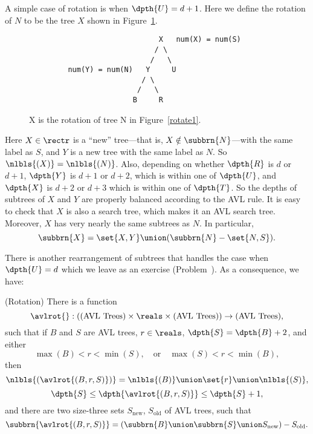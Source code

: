 \begin{definition}
\begin{figure}
\end{figure}

A simple case of rotation is when $\dpth{U} = d+1$.  Here we define
the rotation of $N$ to be the tree $X$ shown in Figure~\ref{rotate2}.

\begin{figure}

\begin{verbatim}
                              X   num(X) = num(S)
                             / \
                            /   \
         num(Y) = num(N)   Y     U
                          / \  
                         /   \
                        B     R   
\end{verbatim}

\caption{X is the rotation of tree N in Figure~\ref{rotate1}.}

\label{rotate2}
                                                                   
\end{figure}                                                       

Here $X \in \rectr$ is a ``new'' tree---that is, $X \notin
\subbrn{N}$---with the same label as $S$, and $Y$ is a new tree with
the same label as $N$.  So $\nlbls{(X)} = \nlbls{(N)}$.  Also,
depending on whether $\dpth{R}$ is $d$ or $d+1$, $\dpth{Y}$ is $d+1$
or $d+2$, which is within one of $\dpth{U}$, and $\dpth{X}$ is $d+2$
or $d+3$ which is within one of $\dpth{T}$.  So the depths of subtrees
of $X$ and $Y$ are properly balanced according to the AVL rule.  It is
easy to check that $X$ is also a search tree, which makes it an AVL
search tree.  Moreover, $X$ has very nearly the same subtrees as $N$.
In particular,
\[
\subbrn{X} = \set{X,Y} \union (\subbrn{N} - \set{N,S}).
\]

There is another rearrangement of subtrees that handles the case when
$\dpth{U} = d$ which we leave as an exercise
(Problem~).  As a consequence, we have:

\begin{lemma}(Rotation)\label{lem:rot}
There is a function
\[
\avlrot{}: (\text{(AVL Trees)} \times \reals\times \text{(AVL Trees)}) \to \text{(AVL Trees)},
\]
such that if $B$ and $S$ are AVL trees, $r \in \reals$, $\dpth{S}=\dpth{B}+2$, and either
\[
\max(B) < r < \min(S),\quad \text{or}\quad  \max(S) < r < \min(B),
\]
then
\[
    \nlbls{(\avlrot{(B,r,S)})} = \nlbls{(B)} \union \set{r} \union \nlbls{(S)},
\]
\[
\dpth{S} \leq \dpth{\avlrot{(B,r,S)}} \leq  \dpth{S}+1,
\]
and there are two size-three sets $S_{\text{new}}$, $S_{\text{old}}$
of AVL trees, such that
\[
\subbrn{\avlrot{(B,r,S)}} = (\subbrn{B} \union \subbrn{S} \union S_{\text{new}}) - S_{\text{old}}.
\]
\end{lemma}


\end{definition}
